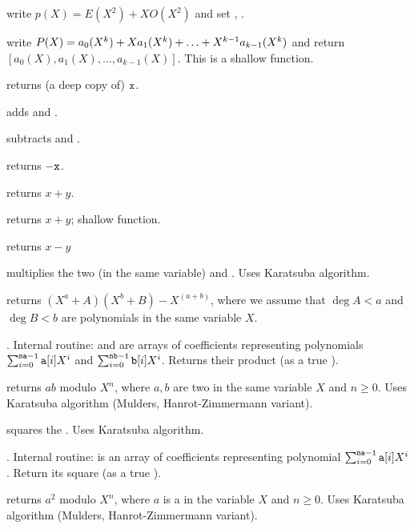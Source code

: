  write $p(X) = E(X^2) +
X O(X^2)$ and set , .

 write
$P(X)=a_0(X^k)+X\*a_1(X^k)+\ldots+X^{k-1}\*a_{k-1}(X^k)$ and return
$[a_0(X),a_1(X),\ldots,a_{k-1}(X)]$.  This is a shallow function.

 returns (a deep copy of) ${\tt x}$.

 adds  and .

 subtracts  and .

 returns $-{\tt x}$.

 returns $x+y$.

 returns $x+y$; shallow function.


 returns $x-y$

 multiplies the two  (in the same
variable)  and . Uses Karatsuba algorithm.

returns $(X^a + A)(X^b + B) - X^(a+b)$, where we assume that $\deg A < a$
and $\deg B < b$ are polynomials in the same variable $X$.

. Internal routine:
 and  are arrays of coefficients representing polynomials
$\sum_{i = 0}^{{\tt na-1}} {\tt a}[i] X^i$ and
$\sum_{i = 0}^{{\tt nb-1}} {\tt b}[i] X^i$. Returns their product (as a true
).

 returns $a b$ modulo $X^n$,
where $a,b$ are two  in the same variable $X$ and $n \geq 0$. Uses
Karatsuba algorithm (Mulders, Hanrot-Zimmermann variant).

 squares the  . Uses Karatsuba
algorithm.

. Internal routine:
 is an array of coefficients representing polynomial
$\sum_{i = 0}^{{\tt na-1}} {\tt a}[i] X^i$. Return its square (as a true
).

 returns $a^2$ modulo $X^n$,
where $a$ is a  in the variable $X$ and $n \geq 0$. Uses
Karatsuba algorithm (Mulders, Hanrot-Zimmermann variant).

